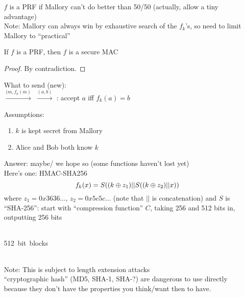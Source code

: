 \begin{itemize}
{    $f$ is a PRF if Mallory can't do better than 50/50 (actually, allow a tiny
            advantage)\\

    Note: Mallory can always win by exhaustive search of the $f_k$'s, so need to
    limit Mallory to ``practical''\\

    \begin{theorem*}{If $f$ is a PRF, then $f$ is a secure MAC}\end{theorem*}
    \begin{proof} By contradiction. \end{proof}
}
\end{itemize}

What to send (new):\\

 $\xrightarrow{(m, f_k(m)}$
     $\xrightarrow{(a,b)}$
     : accept $a$ iff $f_k(a) = b$

Assumptions:
\begin{enumerate}
    \item $k$ is kept secret from Mallory
    \item Alice and Bob both know $k$
\end{enumerate}

Answer: maybe/ we hope so (some functions haven't lost yet)\\

Here's one: HMAC-SHA256
$$f_k(x) = S((k \oplus z_1) || S((k \oplus z_2) || x))$$
where $z_1 = 0x3636\dots$, $z_2 = 0x5c5c\dots$ (note that $||$ is concatenation)
and $S$ is ``SHA-256'': start with ``compression function'' $C$, taking 256 and
512 bits in, outputting 256 bits

\makebox[2cm]{}\\
\makebox[2cm]{}\framebox[2cm]{}\framebox[2cm]{}\framebox[2cm]{}\framebox[2cm]{}
\mbox{512 bit blocks}\\
\makebox[2cm]{}\makebox[2cm]{$\Downarrow$}\makebox[2cm]{$\Downarrow$}
\makebox[2cm]{$\Downarrow$}\makebox[2cm]{$\Downarrow$}\\
\makebox[.2cm]{$\rightarrow$}
\makebox[4.4cm]{$\cdots$}

Note: This is subject to length extension attacks\\

``cryptographic hash'' (MD5, SHA-1, SHA-?) are dangerous to use directly because
they don't have the properties you think/want then to have.\\

